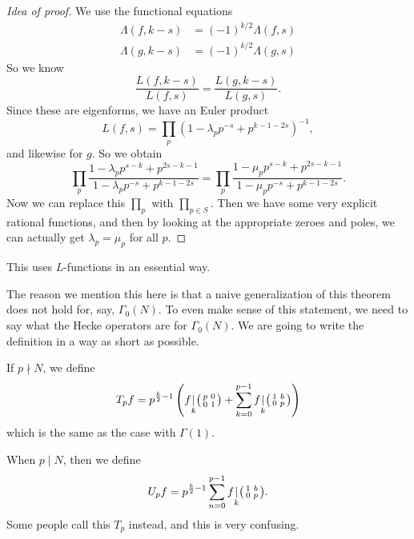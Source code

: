 \documentclass[a4paper]{article}
\begin{document}
\begin{proof}[Idea of proof]
  We use the functional equations
  \begin{align*}
    \Lambda(f, k - s) &= (-1)^{k/2} \Lambda(f, s)\\
    \Lambda(g, k - s) &= (-1)^{k/2} \Lambda(g, s)
  \end{align*}
  So we know
  \[
    \frac{L(f, k - s)}{L(f, s)} = \frac{L(g, k - s)}{L(g, s)}.
  \]
  Since these are eigenforms, we have an Euler product
  \[
    L(f, s) = \prod_p (1 - \lambda_p p^{-s} + p^{k - 1 - 2s})^{-1},
  \]
  and likewise for $g$. So we obtain
  \[
    \prod_p \frac{1 - \lambda_p p^{s - k} + p^{2s - k - 1}}{1 - \lambda_p p^{-s} + p^{k - 1 - 2s}} = \prod_p \frac{1 - \mu_p p^{s - k} + p^{2s - k - 1}}{1 - \mu_p p^{-s} + p^{k - 1 - 2s}}.
  \]
  Now we can replace this $\prod_p$ with $\prod_{p \in S}$. Then we have some very explicit rational functions, and then by looking at the appropriate zeroes and poles, we can actually get $\lambda_p = \mu_p$ for all $p$.
\end{proof}
This uses $L$-functions in an essential way.

The reason we mention this here is that a naive generalization of this theorem does not hold for, say, $\Gamma_0(N)$. To even make sense of this statement, we need to say what the Hecke operators are for $\Gamma_0(N)$. We are going to write the definition in a way as short as possible.
\begin{defi}
  If $p \nmid N$, we define
  \[
    T_p f = p^{\frac{k}{2} - 1} \left(f \underset{k}{|}
    \begin{psmallmatrix}
      p & 0\\
      0 & 1
    \end{psmallmatrix} +
    \sum_{k = 0}^{p - 1} f \underset{k}{|}
    \begin{psmallmatrix}
       1 & b\\
       0 & p
    \end{psmallmatrix}\right)
  \]
  which is the same as the case with $\Gamma(1)$.

  When $p \mid N$, then we define
  \[
    U_p f = p^{\frac{k}{2} - 1} \sum_{n = 0}^{p - 1} f\underset{k}{|}
    \begin{psmallmatrix}
      1 & b\\
      0 & p
    \end{psmallmatrix}.
  \]
  Some people call this $T_p$ instead, and this is very confusing.
\end{defi}
\end{document}
